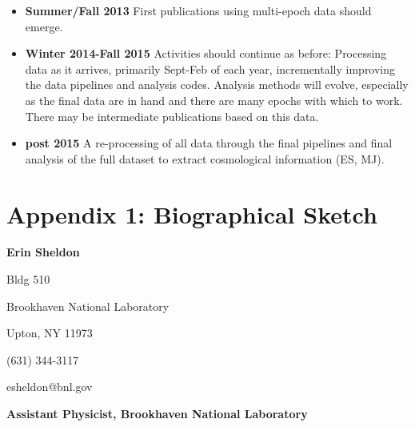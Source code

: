 \documentclass[12pt]{article}
\begin{document}
\begin{itemize}
\item {\bf Summer/Fall 2013}   First publications using multi-epoch data should
emerge.

\item {\bf Winter 2014-Fall 2015}  Activities should continue as before:
Processing data as it arrives, primarily Sept-Feb of each year, incrementally
improving the data pipelines and analysis codes.  Analysis methods will evolve,
especially as the final data are in hand and there are many epochs with which
to work.   There may be intermediate publications based on this data.

\item {\bf post 2015} A re-processing of all data through the final pipelines
and final analysis of the full dataset to extract cosmological information (ES, MJ).



\end{itemize}







\newpage
{}
\section*{Appendix 1: Biographical Sketch}


\newcommand{\tsp}{\vspace{0.1cm}}
\newcommand{\isp}{\vspace{0.3cm}}
\newcommand{\ssp}{\vspace{0.4cm}}


{\Large {\bf Erin Sheldon}}
\tsp
%
%

\noindent
Bldg 510

\noindent
Brookhaven National Laboratory

\noindent
Upton, NY 11973

\noindent
(631) 344-3117

\noindent
esheldon@bnl.gov


\ssp
\ssp
\noindent
{}
{\bf Assistant Physicist, Brookhaven National Laboratory}

\hfill
{}
\normalsize
\end{document}
